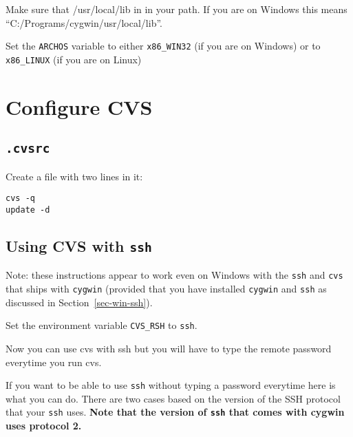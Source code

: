\documentclass{article}
\def\t#1{{\tt #1}}
\begin{document}
 Make sure that /usr/local/lib in in your path. If you are on Windows this
 means ``C:/Programs/cygwin/usr/local/lib''. 

 Set the \t{ARCHOS} variable to either \t{x86\_WIN32} (if you are on Windows)
 or to \t{x86\_LINUX} (if you are on Linux)


\section{Configure CVS}

 \subsection{\t{.cvsrc}}

 Create a  file with two lines in it: 
\begin{verbatim}
cvs -q
update -d
\end{verbatim}

 \subsection{Using CVS with \t{ssh}}

 Note: these instructions appear to work even on Windows with the \t{ssh} and
\t{cvs} that ships with \t{cygwin} (provided that you have installed
\t{cygwin} and \t{ssh} as discussed in Section~\ref{sec-win-ssh}).

 Set the environment variable \t{CVS\_RSH} to \t{ssh}. 

 Now you can use cvs with ssh but you will have to type the remote password
 everytime you run cvs. 

 If you want to be able to use \t{ssh} without typing a password everytime
here is what you can do. There are two cases based on the version of the SSH
protocol that your \t{ssh} uses. {\bf Note that the version of \t{ssh} that
comes with cygwin uses protocol 2.}
\end{document}
